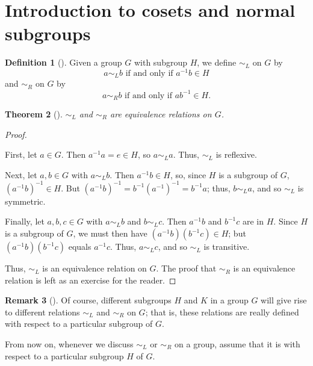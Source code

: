 \documentclass[10pt,openany,oneside]{book}
\theoremstyle{plain}
\newtheorem{theorem}{Theorem}[section]
\theoremstyle{definition}
\newtheorem{definition}[theorem]{Definition}
\theoremstyle{definition}
\newtheorem{remark}[theorem]{Remark}
\theoremstyle{definition}
\theoremstyle{definition}
\numberwithin{equation}{section}
\def\siml{\sim_L}
\def\simr{\sim_R}
\begin{document}
\section[{Introduction to cosets and normal subgroups}]{Introduction to cosets and normal subgroups}\label{section-23}
\begin{definition}[{}]\label{definition-59}
\label{notation-66}
\label{notation-67}
Given a group \(G\) with subgroup \(H\), we define \(\siml\) on \(G\) by%
\begin{equation*}
a\siml b \text{ if and only if }
a^{-1}b\in H
\end{equation*}
and \(\simr\) on \(G\) by%
\begin{equation*}
a\simr b \text{ if and only if }
ab^{-1}\in H.
\end{equation*}
%
\end{definition}
\begin{theorem}[{}]\label{simlreq}
\(\siml\) and \(\simr\) are equivalence relations on \(G\).%
\end{theorem}
\begin{proof}\hypertarget{proof-35}{}
First, let \(a\in G\). Then \(a^{-1}a=e\in H\), so \(a\siml a\). Thus, \(\siml\) is reflexive.%
\par
Next, let \(a,b\in G\) with \(a\siml b\). Then \(a^{-1}b\in H\), so, since \(H\) is a subgroup of \(G\), \((a^{-1}b)^{-1}\in H\). But \((a^{-1}b)^{-1}=b^{-1}(a^{-1})^{-1}=b^{-1}a\); thus, \(b\siml a\), and so \(\siml\) is symmetric.%
\par
Finally, let \(a,b,c\in G\) with \(a\siml b\) and \(b\siml c\). Then \(a^{-1}b\) and \(b^{-1}c\) are in \(H\). Since \(H\) is a subgroup of \(G\), we must then have \((a^{-1}b)(b^{-1}c)\in H\); but \((a^{-1}b)(b^{-1}c)\) equals \(a^{-1}c\). Thus, \(a\siml c\), and so \(\siml\) is transitive.%
\par
Thus, \(\siml\) is an equivalence relation on \(G\). The proof that \(\simr\) is an equivalence relation is left as an exercise for the reader.%
\end{proof}
\begin{remark}[]\label{remark-38}
Of course, different subgroups \(H\) and \(K\) in a group \(G\) will give rise to different relations \(\siml\) and \(\simr\) on \(G\); that is, these relations are really defined  with respect to a particular subgroup of \(G\).%
\end{remark}
From now on, whenever we discuss \(\siml\) or \(\simr\) on a group, assume that it is with respect to a particular subgroup \(H\) of \(G\).%
\end{document}
